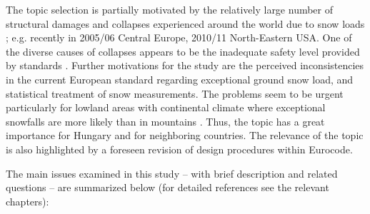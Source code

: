 The topic selection is partially motivated by the relatively large number of structural damages and collapses experienced around the world due to snow loads \citep{Geis2011}; e.g. recently in 2005/06 Central Europe, 2010/11 North-Eastern USA. One of the diverse causes of collapses appears to be the inadequate safety level provided by standards \citep{Holicky2009, Meloysund2010}. Further motivations for the study are the perceived inconsistencies in the current European standard regarding exceptional ground snow load, and statistical treatment of snow measurements. The problems seem to be urgent particularly for lowland areas with continental climate where exceptional snowfalls are more likely than in mountains \citep{Sanpaolesi1998}. Thus, the topic has a great importance for Hungary and for neighboring countries. The relevance of the topic is also highlighted by a foreseen revision of design procedures within Eurocode. 

The main issues examined in this study -- with brief description and related questions -- are summarized below (for detailed references see the relevant chapters):

